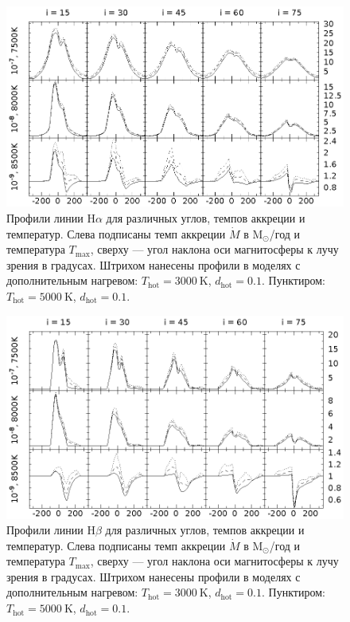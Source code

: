 \documentclass{article}
\begin{document}
 


\begin{figure}[h]
\centering
\includegraphics[width=\textwidth]{hot_5_Ha.eps}
\caption{Профили линии $\text{H}\alpha$ для различных углов, темпов аккреции и температур. Слева подписаны темп аккреции $\dot{M}$ в $\text{M}_\odot$/год и температура $T_\text{max}$, сверху --- угол наклона оси магнитосферы к лучу зрения в градусах. Штрихом нанесены профили в моделях с дополнительным нагревом: $T_\text{hot} = 3000\ \text{K}$, $d_\text{hot} = 0.1$. Пунктиром: $T_\text{hot} = 5000\ \text{K}$, $d_\text{hot} = 0.1$.}
\label{fig:Ha}
\end{figure}
\begin{figure}[h]
\centering
\includegraphics[width=\textwidth]{hot_5_Hb.eps}
\caption{Профили линии $\text{H}\beta$ для различных углов, темпов аккреции и температур. Слева подписаны темп аккреции $\dot{M}$ в $\text{M}_\odot$/год и температура $T_\text{max}$, сверху --- угол наклона оси магнитосферы к лучу зрения в градусах. Штрихом нанесены профили в моделях с дополнительным нагревом: $T_\text{hot} = 3000\ \text{K}$, $d_\text{hot} = 0.1$. Пунктиром: $T_\text{hot} = 5000\ \text{K}$, $d_\text{hot} = 0.1$.}
\label{fig:Hb}
\end{figure}
\end{document}
